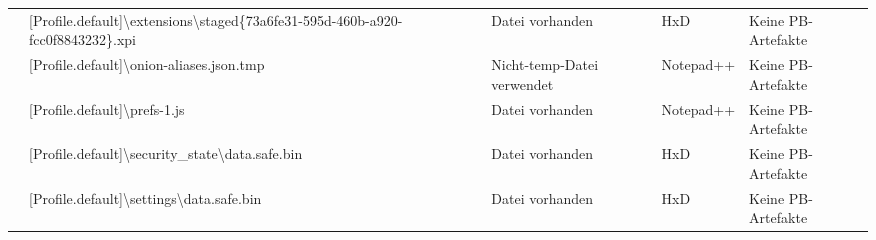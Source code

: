 \begin{appendices}
{\begin{landscape}
\begin{table}[h!]
{\begin{tabular}{cllll}
	\multicolumn{1}{|c|}{}                                                                                        & \multicolumn{1}{l|}{\cellcolor[HTML]{3190FF}[Profile.default]\textbackslash{}extensions\textbackslash{}staged\{73a6fe31-595d-460b-a920-fcc0f8843232\}.xpi}      & \multicolumn{1}{l|}{\cellcolor[HTML]{009901}Datei vorhanden}            & \multicolumn{1}{l|}{\cellcolor[HTML]{FFFFFF}HxD}                  & \multicolumn{1}{l|}{\cellcolor[HTML]{F8A102}Keine PB-Artefakte} \\ \cline{2-5} 
	\multicolumn{1}{|c|}{}                                                                                        & \multicolumn{1}{l|}{\cellcolor[HTML]{3190FF}[Profile.default]\textbackslash{}onion-aliases.json.tmp}                                                            & \multicolumn{1}{l|}{\cellcolor[HTML]{FCFF2F}Nicht-temp-Datei verwendet} & \multicolumn{1}{l|}{\cellcolor[HTML]{FFFFFF}Notepad++}            & \multicolumn{1}{l|}{\cellcolor[HTML]{F8A102}Keine PB-Artefakte} \\ \cline{2-5} 
	\multicolumn{1}{|c|}{}                                                                                        & \multicolumn{1}{l|}{\cellcolor[HTML]{3190FF}[Profile.default]\textbackslash{}prefs-1.js}                                                                        & \multicolumn{1}{l|}{\cellcolor[HTML]{009901}Datei vorhanden}            & \multicolumn{1}{l|}{\cellcolor[HTML]{FFFFFF}Notepad++}            & \multicolumn{1}{l|}{\cellcolor[HTML]{F8A102}Keine PB-Artefakte} \\ \cline{2-5} 
	\multicolumn{1}{|c|}{}                                                                                        & \multicolumn{1}{l|}{\cellcolor[HTML]{3190FF}[Profile.default]\textbackslash{}security\_state\textbackslash{}data.safe.bin}                                      & \multicolumn{1}{l|}{\cellcolor[HTML]{009901}Datei vorhanden}            & \multicolumn{1}{l|}{\cellcolor[HTML]{FFFFFF}HxD}                  & \multicolumn{1}{l|}{\cellcolor[HTML]{F8A102}Keine PB-Artefakte} \\ \cline{2-5} 
	\multicolumn{1}{|c|}{}                                                                                        & \multicolumn{1}{l|}{\cellcolor[HTML]{3190FF}[Profile.default]\textbackslash{}settings\textbackslash{}data.safe.bin}                                             & \multicolumn{1}{l|}{\cellcolor[HTML]{009901}Datei vorhanden}            & \multicolumn{1}{l|}{\cellcolor[HTML]{FFFFFF}HxD}                  & \multicolumn{1}{l|}{\cellcolor[HTML]{F8A102}Keine PB-Artefakte} \\ \cline{2-5} 

\end{tabular}}
\end{table}
\end{landscape}}
\end{appendices}
